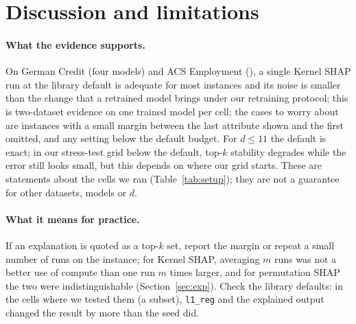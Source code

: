 \section{Discussion and limitations}
\label{sec:disc}
\paragraph{What the evidence supports.}
On German Credit (four models) and ACS Employment (\numacsEmpModels), a single Kernel SHAP run at the library default is adequate for most instances and its noise is smaller than the change that a retrained model brings under our retraining protocol; this is two-dataset evidence on one trained model per cell; the cases to worry about are instances with a small margin between the last attribute shown and the first omitted, and any setting below the default budget. For $d\le11$ the default is exact; in our stress-test grid below the default, top-$k$ stability degrades while the error still looks small, but this depends on where our grid starts. These are statements about the cells we ran (Table~\ref{tab:setup}); they are not a guarantee for other datasets, models or $d$.
\paragraph{What it means for practice.}
If an explanation is quoted as a top-$k$ set, report the margin or repeat a small number of runs on the instance; for Kernel SHAP, averaging $m$ runs was not a better use of compute than one run $m$ times larger, and for permutation SHAP the two were indistinguishable (Section~\ref{sec:exp}). Check the library defaults: in the cells where we tested them (a subset), \texttt{l1\_reg} and the explained output changed the result by more than the seed did.

